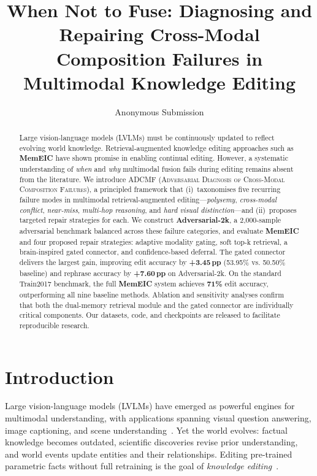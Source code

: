 \documentclass[11pt]{article}
\title{When Not to Fuse: Diagnosing and Repairing Cross-Modal\\
Composition Failures in Multimodal Knowledge Editing}
\author{%
  Anonymous Submission
}
\date{}
\newcommand{\memeic}{\textbf{MemEIC}}
\newcommand{\adcmf}{\textsc{ADCMF}}
\newcommand{\best}[1]{\textcolor{memgreen}{\textbf{#1}}}
\begin{document}
\maketitle

\begin{abstract}
Large vision-language models (LVLMs) must be continuously updated to reflect
evolving world knowledge. Retrieval-augmented knowledge editing approaches such
as \memeic{} have shown promise in enabling continual editing. However, a
systematic understanding of \emph{when} and \emph{why} multimodal fusion fails
during editing remains absent from the literature. We introduce \adcmf{}
(\textsc{Adversarial Diagnosis of Cross-Modal Composition Failures}), a
principled framework that (i)~taxonomises five recurring failure modes in
multimodal retrieval-augmented editing---\emph{polysemy}, \emph{cross-modal
conflict}, \emph{near-miss}, \emph{multi-hop reasoning}, and \emph{hard
visual distinction}---and (ii)~proposes targeted repair strategies for each.
We construct \textbf{Adversarial-2k}, a 2{,}000-sample adversarial benchmark
balanced across these failure categories, and evaluate \memeic{} and four
proposed repair strategies: adaptive modality gating, soft top-k retrieval, a
brain-inspired gated connector, and confidence-based deferral. The gated
connector delivers the largest gain, improving edit accuracy by
\best{+3.45\,pp} (53.95\% vs. 50.50\% baseline) and rephrase accuracy by
\best{+7.60\,pp} on Adversarial-2k. On the standard Train2017 benchmark, the
full \memeic{} system achieves \best{71\%} edit accuracy, outperforming all
nine baseline methods. Ablation and sensitivity analyses confirm that both the
dual-memory retrieval module and the gated connector are individually critical
components. Our datasets, code, and checkpoints are released to facilitate
reproducible research.
\end{abstract}

\section{Introduction}
\label{sec:intro}

Large vision-language models (LVLMs) have emerged as powerful engines for
multimodal understanding, with applications spanning visual question
answering, image captioning, and scene understanding~\citep{openai2024gpt4,
li2023blip, zhu2024minigpt4, liu2024visual}. Yet the world evolves: factual
knowledge becomes outdated, scientific discoveries revise prior
understanding, and world events update entities and their relationships.
Editing pre-trained parametric facts without full retraining is the goal of
\emph{knowledge editing}~\citep{wang2024knowledge, yao2023editing, meng2022rome,
peng2024easyedit}.
\end{document}
